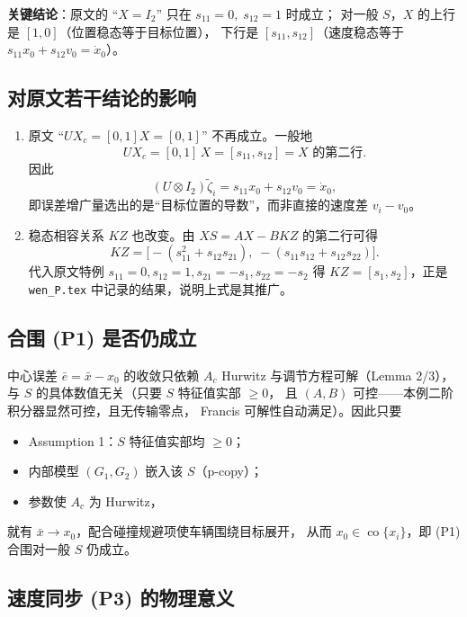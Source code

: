 \textbf{关键结论}：原文的 “$X=I_2$” 只在 $s_{11}=0,\;s_{12}=1$ 时成立；
对一般 $S$，$X$ 的上行是 $[1,0]$（位置稳态等于目标位置），
下行是 $[s_{11},s_{12}]$（速度稳态等于 $s_{11}x_0+s_{12}v_0=\dot x_0$）。

\subsection{对原文若干结论的影响}

\begin{enumerate}
  \item 原文 “$UX_c=[0,1]X=[0,1]$” 不再成立。一般地
    \[
    UX_c = [0,1]\,X = [s_{11},s_{12}] = \text{$X$ 的第二行}.
    \]
    因此
    \[
    (U\otimes I_2)\tilde\zeta_i = s_{11}x_0 + s_{12}v_0 = \dot x_0,
    \]
    即误差增广量选出的是“目标位置的导数”，而非直接的速度差 $v_i-v_0$。

  \item 稳态相容关系 $KZ$ 也改变。由 $XS=AX-BKZ$ 的第二行可得
    \[
    KZ = \bigl[-(s_{11}^2+s_{12}s_{21}),\; -(s_{11}s_{12}+s_{12}s_{22})\bigr].
    \]
    代入原文特例 $s_{11}=0,s_{12}=1,s_{21}=-s_1,s_{22}=-s_2$ 得
    $KZ=[s_1,s_2]$，正是 \texttt{wen\_P.tex} 中记录的结果，说明上式是其推广。
\end{enumerate}

\subsection{合围 (P1) 是否仍成立}

中心误差 $\bar e = \bar x - x_0$ 的收敛只依赖
$A_c$ Hurwitz 与调节方程可解（Lemma 2/3），
与 $S$ 的具体数值无关（只要 $S$ 特征值实部 $\ge 0$，
且 $(A,B)$ 可控——本例二阶积分器显然可控，且无传输零点，
Francis 可解性自动满足）。因此只要
\begin{itemize}
  \item Assumption 1：$S$ 特征值实部均 $\ge 0$；
  \item 内部模型 $(G_1,G_2)$ 嵌入该 $S$（p-copy）；
  \item 参数使 $A_c$ 为 Hurwitz，
\end{itemize}
就有 $\bar x\to x_0$，配合碰撞规避项使车辆围绕目标展开，
从而 $x_0\in\operatorname{co}\{x_i\}$，即 (P1) 合围对一般 $S$ 仍成立。

\subsection{速度同步 (P3) 的物理意义}

